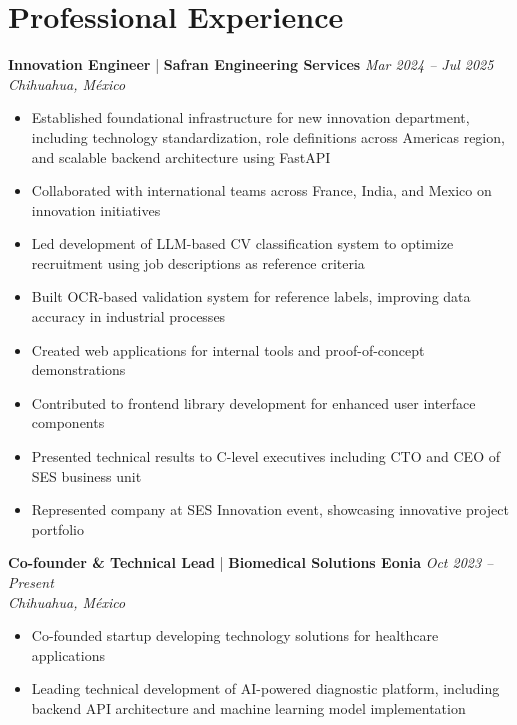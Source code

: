 \section*{Professional Experience}

\textbf{Innovation Engineer} | \textbf{Safran Engineering Services} 
\hfill {
   \textit{
   \color{lightgray}
   Mar 2024 -- Jul 2025
   }
} \\
\textit{
   \color{mediumgray}
   Chihuahua, México
}
\begin{itemize}
   \item Established foundational infrastructure for new innovation department, including technology standardization, role definitions across Americas region, and scalable backend architecture using FastAPI
   \item Collaborated with international teams across France, India, and Mexico on innovation initiatives
   \item Led development of LLM-based CV classification system to optimize recruitment using job descriptions as reference criteria
   \item Built OCR-based validation system for reference labels, improving data accuracy in industrial processes
   \item Created web applications for internal tools and proof-of-concept demonstrations
   \item Contributed to frontend library development for enhanced user interface components
   \item Presented technical results to C-level executives including CTO and CEO of SES business unit
   \item Represented company at SES Innovation event, showcasing innovative project portfolio
\end{itemize}

\textbf{Co-founder \& Technical Lead} | \textbf{Biomedical Solutions Eonia} 
\hfill {
   \textit{
   \color{lightgray}
   Oct 2023 -- Present
   }
} \\
\textit{
   \color{mediumgray}
   Chihuahua, México
}
\begin{itemize}
   \item Co-founded startup developing technology solutions for healthcare applications
    \item Leading technical development of AI-powered diagnostic platform, including backend API architecture and machine learning model implementation
\end{itemize}